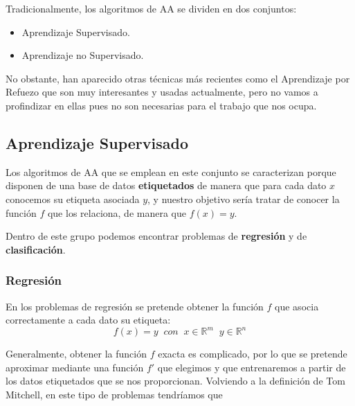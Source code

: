     \medskip

    \noindent Tradicionalmente, los algoritmos de AA se dividen en dos conjuntos:

    \begin{itemize}
        \item Aprendizaje Supervisado.
        \item Aprendizaje no Supervisado.
    \end{itemize}

    \medskip 
    
    \noindent No obstante, han aparecido otras técnicas más recientes como el Aprendizaje por Refuezo que son muy interesantes y usadas actualmente, pero no vamos a profindizar en ellas pues no son necesarias para el trabajo que nos ocupa.

    \subsection{Aprendizaje Supervisado}
        \noindent Los algoritmos de AA que se emplean en este conjunto se caracterizan porque disponen de una base de datos \textbf{etiquetados} de manera que para cada dato $x$ conocemos su etiqueta asociada $y$, y nuestro objetivo sería tratar de conocer la función $f$ que los relaciona, de manera que $f(x)=y$.

        \medskip

        \noindent Dentro de este grupo podemos encontrar problemas de \textbf{regresión} y de \textbf{clasificación}.

        \subsubsection{Regresión} \label{section::Regresion}
            \noindent En los problemas de regresión se pretende obtener la función $f$ que asocia correctamente a cada dato su etiqueta: 
            \begin{equation}
                f(x)=y \; \; con \; \; x\in \mathbb{R}^m \; \; y \in \mathbb{R}^n
            \end{equation}
            
            \noindent Generalmente, obtener la función $f$ exacta es complicado, por lo que se pretende aproximar mediante una función $f'$ que elegimos y que entrenaremos a partir de los datos etiquetados que se nos proporcionan. Volviendo a la definición de Tom Mitchell, en este tipo de problemas tendríamos que 
            
